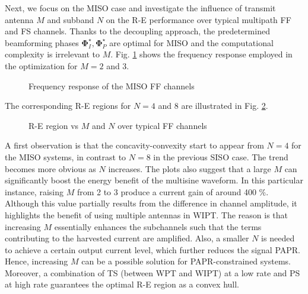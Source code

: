 Next, we focus on the MISO case and investigate the influence of transmit antenna $M$ and subband $N$ on the R-E performance over typical multipath FF and FS channels. Thanks to the decoupling approach, the predetermined beamforming phases ${\mathbf{\Phi }}_I^ \star ,{\mathbf{\Phi }}_P^ \star $ are optimal for MISO and the computational complexity is irrelevant to $M$. Fig. \ref{fig:miso-channel} shows the frequency response employed in the optimization for $M = 2$ and 3.

\begin{figure}[ht]
  \centering
  \caption{Frequency response of the MISO FF channels}
  \label{fig:miso-channel}
\end{figure}

The corresponding R-E regions for $N = 4$ and 8 are illustrated in Fig. \ref{fig:miso-re}.

\begin{figure}[ht]
  \centering
  \caption{R-E region vs $M$ and $N$ over typical FF channels}
  \label{fig:miso-re}
\end{figure}

A first observation is that the concavity-convexity start to appear from $N = 4$ for the MISO systems, in contrast to $N = 8$ in the previous SISO case. The trend becomes more obvious as $N$ increases. The plots also suggest that a large $M$ can significantly boost the energy benefit of the multisine waveform. In this particular instance, raising $M$ from 2 to 3 produce a current gain of around 400 \%. Although this value partially results from the difference in channel amplitude, it highlights the benefit of using multiple antennas in WIPT. The reason is that increasing $M$ essentially enhances the subchannels such that the terms contributing to the harvested current are amplified. Also, a smaller $N$ is needed to achieve a certain output current level, which further reduces the signal PAPR. Hence, increasing $M$ can be a possible solution for PAPR-constrained systems. Moreover, a combination of TS (between WPT and WIPT) at a low rate and PS at high rate guarantees the optimal R-E region as a convex hull.

